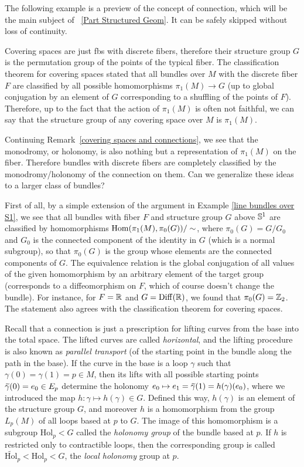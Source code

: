 The following example is a preview of the concept of connection, which will be the main subject of \Part~\ref{Part Structured Geom}. It can be safely skipped without loss of continuity.

\begin{example}
	Covering spaces are just \glspl{fb} with discrete fibers, therefore their structure group $G$ is the permutation group of the points of the typical fiber. The classification theorem for covering spaces stated that all bundles over $M$ with the discrete fiber $F$ are classified by all possible homomorphisms $\pi_1(M)\to G$ (up to global conjugation by an element of $G$ corresponding to a shuffling of the points of $F$). Therefore, up to the fact that the action of $\pi_1(M)$ is often not faithful, we can say that the structure group of any covering space over $M$ is $\pi_1(M)$.
	
	Continuing Remark~\ref{covering spaces and connections}, we see that the monodromy, or holonomy, is also nothing but a representation of $\pi_1(M)$ on the fiber. Therefore bundles with discrete fibers are completely classified by the monodromy/holonomy of the connection on them. Can we generalize these ideas to a larger class of bundles?
	
	First of all, by a simple extension of the argument in Example \ref{line bundles over S1}, we see  that all bundles with fiber $F$ and structure group $G$ above $\mathbb{S}^1$ are classified by homomorphisms $\operatorname{Hom}(\pi_1(M),\pi_0(G))/\sim$, where $\pi_0(G)=G/G_0$ and $G_0$ is the connected component of the identity in $G$ (which is a normal subgroup), so that $\pi_0(G)$ is the group whose elements are the connected components of $G$. The equivalence relation is the global conjugation of all values of the given homomorphism by an arbitrary element of the target group (corresponds to a diffeomorphism on $F$, which of course doesn't change the bundle). For instance, for $F=\mathbb{R} $ and $G=\operatorname{Diff}(\mathbb{R} )$, we found that $\pi_0(G)=\mathbb{Z}_2$. The statement also agrees with the classification theorem for covering spaces.
	
	Recall that a connection is just a prescription for lifting curves from the base into the total space. The lifted curves are called \emph{horizontal}, and the lifting procedure is also known as \emph{parallel transport} (of the starting point in the bundle along the path in the base). If the curve in the base is a loop $\gamma$ such that $\gamma(0)=\gamma(1)=p\in M$, then its lifts with all possible starting points $\wt{\gamma}(0)=e_0\in E_p$ determine the holonomy $e_0\mapsto e_1=\wt{\gamma}(1)=h(\gamma)(e_0)$, where we introduced the map $h:\gamma\mapsto h(\gamma)\in G$. Defined this way, $h(\gamma)$ is an element of the structure group $G$, and moreover $h$ is a homomorphism from the group $L_p(M)$ of all loops based at $p$ to $G$. The image of this homomorphism is a subgroup $\mathrm{Hol}_p<G$ called the \emph{holonomy group} of the bundle based at $p$. If $h$ is restricted only to contractible loops, then the corresponding group is called $\widetilde{\mathrm{Hol}}_p<\mathrm{Hol}_p<G$, the \emph{local holonomy} group at $p$. 
	

\end{example}
